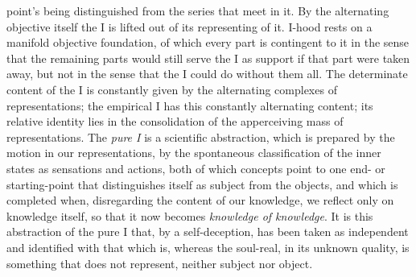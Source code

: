 point's being distinguished from the series that meet in it. By the
alternating objective itself the I is lifted out of its representing of
it. I-hood rests on a manifold objective foundation, of which
every part is contingent to it in the sense that the remaining parts
would still serve the I as support if that part were taken away, but not
in the sense that the I could do without them all. The determinate
content of the I is constantly given by the alternating complexes of
representations; the empirical I has this constantly alternating content;
its relative identity lies in the consolidation of the apperceiving mass
of representations. The \emph{pure I} is a scientific abstraction, which
is prepared by the motion in our representations, by the spontaneous
classification of the inner states as sensations and actions, both of
which concepts point to one end- or starting-point that distinguishes
itself as subject from the objects, and which is completed when,
disregarding the content of our knowledge, we reflect only on knowledge
itself, so that it now becomes \emph{knowledge of knowledge}. It is this
abstraction of the pure I that, by a self-deception, has been taken as
independent and identified with that which is, whereas the soul-real, in
its unknown quality, is something that does not represent, neither
subject nor object.

